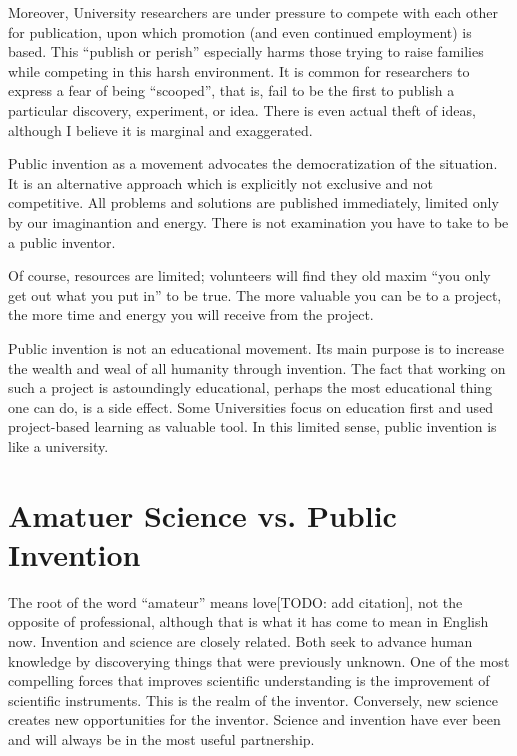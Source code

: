 \documentclass[
	fontsize=10pt, %
	twoside=false, %
	secnumdepth=1, %
]{kaobook}
\begin{document}
Moreover, University researchers are under pressure
to compete with each other for publication, upon which
promotion (and even continued employment) is based.
This ``publish or perish'' especially harms
those trying to raise families while
competing in this harsh environment.
It is common for researchers to express a fear of
being ``scooped'', that is, fail to be the first
to publish a particular discovery, experiment, or idea.
There is even actual theft of ideas, although I believe
it is marginal and exaggerated.

Public invention as a movement advocates the democratization
of the situation. It is an alternative approach
which is explicitly not exclusive and not competitive.
All problems and solutions are published immediately,
limited only by our imaginantion and energy.
There is not examination you have to take to be
a public inventor.

Of course, resources are limited; volunteers will
find they old maxim ``you only get out what you put in'' to be true.
The more valuable you can be to a project, the more time
and energy you will receive from the project.

Public invention is not an educational movement.
Its main purpose is to increase the wealth and
weal of all humanity through invention.
The fact that working on such a project is astoundingly
educational, perhaps the most educational thing one can do,
is a side effect. Some Universities focus on education
first and used project-based learning as valuable tool.
In this limited sense, public invention is like a university.

\chapter{Amatuer Science vs. Public Invention}

The root of the word ``amateur'' means love[TODO: add citation], not the
opposite of professional, although that is what it has come to mean in English now.
Invention and science are closely related.
Both seek to advance human knowledge by discoverying things
that were previously unknown.
One of the most compelling forces that improves scientific understanding
is the improvement of scientific instruments.
This is the realm of the inventor.
Conversely, new science creates new opportunities for the inventor.
Science and invention have ever been and will always be in
the most useful partnership.
\end{document}

